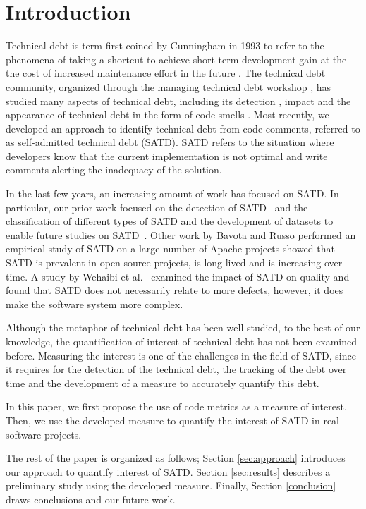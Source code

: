 \section{Introduction}
Technical debt is term first coined by Cunningham in 1993 to refer to the phenomena of taking a shortcut to achieve short term development gain at the the cost of increased maintenance effort in the future \cite{Cunningham1992WPM}. The technical debt community, organized through the managing technical debt workshop \cite{MTD2016}, has studied many aspects of technical debt, including its detection \cite{Zazworka2013CSE}, impact \cite{Zazworka2011MTD}
and the appearance of technical debt in the form of code smells \cite{Fontana2012MTD}. Most recently, we developed an approach to identify technical debt from code comments, referred to as self-admitted technical debt (SATD). SATD refers to the situation where developers know that the current implementation is not optimal and write comments alerting the inadequacy of the solution.

In the last few years, an increasing amount of work has focused on SATD. In particular, our prior work focused on the detection of SATD~\cite{Potdar2014ICSME} and the classification of different types of SATD and the development of datasets to enable future studies on SATD~\cite{Maldonado2015MTD}. Other work by Bavota and Russo performed an empirical study of SATD on a large number of Apache projects showed that SATD is prevalent in open source projects, is long lived and is increasing over time. A study by Wehaibi et al.~\cite{Wehaibi2016SANER} examined the impact of SATD on quality and found that SATD does not necessarily relate to more defects, however, it does make the software system more complex. 

Although the metaphor of technical debt has been well studied, to the best of our knowledge, the quantification of interest of technical debt has not been examined before. Measuring the interest is one of the challenges in the field of SATD, since it requires for the detection of the technical debt, the tracking of the debt over time and the development of a measure to accurately quantify this debt. 

In this paper, we first propose the use of code metrics as a measure of interest. Then, we use the developed measure to quantify the interest of SATD in real software projects.

The rest of the paper is organized as follows; Section \ref{sec:approach} introduces our approach to quantify interest of SATD. Section \ref{sec:results} describes a preliminary study using the developed measure. Finally, Section \ref{conclusion} draws conclusions and our future work.
